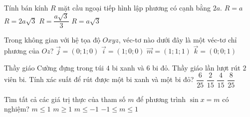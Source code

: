 \begin{ex}%
Tính bán kính $R$ mặt cầu ngoại tiếp hình lập phương có cạnh bằng $2a$.
\choice
{$R = a$}
{$R = 2a\sqrt{3}$}
{$R = \dfrac{a\sqrt{3}}{3}$}
{\True $R = a\sqrt{3}$}
\end{ex}
\begin{ex}%
Trong không gian với hệ tọa độ $Oxyz$, véc-tơ nào dưới đây là một véc-tơ chỉ phương của $Oz$?
\choice
{$\overrightarrow{j} = \left(0;1;0\right)$}
{$\overrightarrow{i} = \left(1;0;0\right)$}
{$\overrightarrow{m} = \left(1;1;1\right)$}
{\True $\overrightarrow{k} = \left(0;0;1\right)$}
\end{ex}
\begin{ex}%
Thầy giáo Cường đựng trong túi $4$ bi xanh và $6$ bi đỏ. Thầy giáo lần lượt rút $2$ viên bi. Tính xác suất để rút được một bi xanh và một bi đỏ?
\choice
{$\dfrac{6}{25}$}
{$\dfrac{2}{15}$}
{\True $\dfrac{4}{15}$}
{$\dfrac{8}{25}$}
\end{ex}
\begin{ex}%
Tìm tất cả các giá trị thực của tham số $m$ để phương trình $\sin x = m$ có nghiệm?
\choice
{$m \le 1$}
{$m \ge 1$}
{$m \le - 1$}
{\True $-1 \le m \le 1$}
\end{ex}

